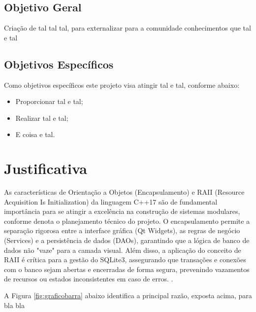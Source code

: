 \documentclass[a4paper,12pt]{article} %
\begin{document}
\subsection{Objetivo Geral}


Criação de tal tal tal, para externalizar para a comunidade conhecimentos que tal e tal

\subsection{Objetivos Específicos}


Como objetivos específicos este projeto visa atingir tal e tal, conforme abaixo:

\begin{itemize}
    \item Proporcionar tal e tal;
    \item Realizar tal e tal;
    \item E coisa e tal.
\end{itemize}


\section{Justificativa}


As características de Orientação a Objetos (Encapsulamento) e RAII (Resource Acquisition Is Initialization) da linguagem C++17 são de fundamental importância para se atingir a excelência na construção de sistemas modulares, conforme denota o planejamento técnico do projeto. O encapsulamento permite a separação rigorosa entre a interface gráfica (Qt Widgets), as regras de negócio (Services) e a persistência de dados (DAOs), garantindo que a lógica de banco de dados não "vaze" para a camada visual. Além disso, a aplicação do conceito de RAII é crítica para a gestão do SQLite3, assegurando que transações e conexões com o banco sejam abertas e encerradas de forma segura, prevenindo vazamentos de recursos ou estados inconsistentes em caso de erros. \cite{Benante2008phd}.

A Figura \ref{fig:graficobarra} abaixo identifica a principal razão, exposta acima, para bla bla
\end{document}
